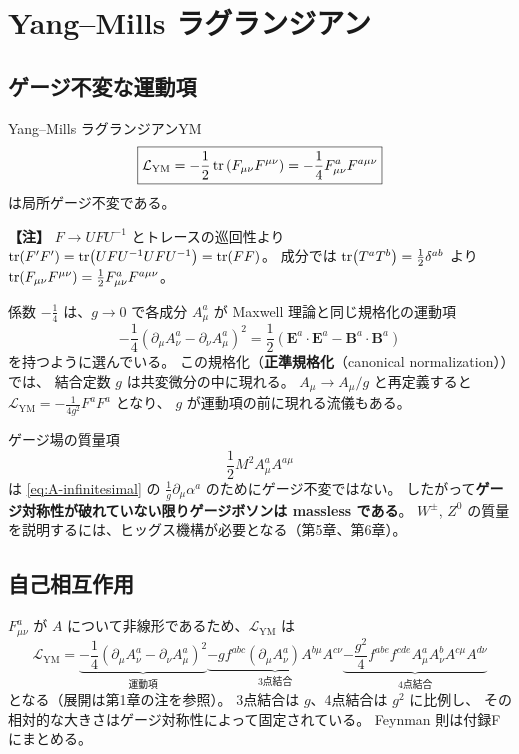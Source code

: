 \documentclass[uplatex,dvipdfmx,a4paper,11pt,openany]{jsbook}
\newcommand{\term}[2]{\textbf{#1}（#2）}
\newenvironment{note}{\vspace{1ex}\par\footnotesize\noindent\textbf{【注】}}{\par\vspace{1ex}}
\numberwithin{equation}{chapter}
\theoremstyle{definition}
\theoremstyle{plain}
\theoremstyle{remark}
\newcommand{\Lag}{\mathcal{L}}
\begin{document}
\section{Yang--Mills ラグランジアン}
\subsection{ゲージ不変な運動項}
\begin{myprop}{Yang--Mills ラグランジアン}{YM}
\begin{equation}
\boxed{
\Lag_{\mathrm{YM}}
=-\frac12\tr\left(F_{\mu\nu}F^{\mu\nu}\right)
=-\frac14F^a_{\mu\nu}F^{a\mu\nu}
}
\end{equation}
は局所ゲージ不変である。
\end{myprop}
\begin{note}
$F\to UFU^{-1}$ とトレースの巡回性より
$\tr(F'F')=\tr(UFU^{-1}UFU^{-1})=\tr(FF)$。
成分では $\tr(T^aT^b)=\frac12\delta^{ab}$ より
$\tr(F_{\mu\nu}F^{\mu\nu})=\frac12F^a_{\mu\nu}F^{a\mu\nu}$。
\end{note}
係数 $-\frac14$ は、$g\to0$ で各成分 $A^a_\mu$ が
Maxwell 理論と同じ規格化の運動項
\begin{equation}
-\frac14(\partial_\mu A_\nu^a-\partial_\nu A_\mu^a)^2
=\frac12\left(\bm E^a\cdot\bm E^a-\bm B^a\cdot\bm B^a\right)
\end{equation}
を持つように選んでいる。
この規格化（\term{正準規格化}{canonical normalization}）では、
結合定数 $g$ は共変微分の中に現れる。
$A_\mu\to A_\mu/g$ と再定義すると $\Lag_{\mathrm{YM}}=-\frac{1}{4g^2}F^aF^a$ となり、
$g$ が運動項の前に現れる流儀もある。

ゲージ場の質量項
\begin{equation}
\frac12M^2A^a_\mu A^{a\mu}
\end{equation}
は \eqref{eq:A-infinitesimal} の $\frac1g\partial_\mu\alpha^a$ のためにゲージ不変ではない。
したがって\textbf{ゲージ対称性が破れていない限りゲージボソンは massless である}。
$W^\pm$, $Z^0$ の質量を説明するには、ヒッグス機構が必要となる（第5章、第6章）。
\subsection{自己相互作用}
$F^a_{\mu\nu}$ が $A$ について非線形であるため、$\Lag_{\mathrm{YM}}$ は
\begin{equation}
\Lag_{\mathrm{YM}}
=\underbrace{-\frac14(\partial_\mu A_\nu^a-\partial_\nu A_\mu^a)^2}_{\text{運動項}}
\underbrace{-gf^{abc}(\partial_\mu A_\nu^a)A^{b\mu}A^{c\nu}}_{\text{3点結合}}
\underbrace{-\frac{g^2}{4}f^{abe}f^{cde}A_\mu^aA_\nu^bA^{c\mu}A^{d\nu}}_{\text{4点結合}}
\end{equation}
となる（展開は第1章の注を参照）。
3点結合は $g$、4点結合は $g^2$ に比例し、
その相対的な大きさはゲージ対称性によって固定されている。
Feynman 則は付録Fにまとめる。
\end{document}
